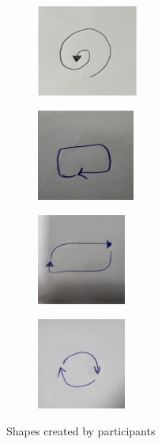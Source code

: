 \documentclass[oneside,%
                    author={Malak Hajji},
                    degree={BSc},
                    title={Designing An Accessible Ozobot Programming Platform for Students},
                  subtitle={With Mixed Visual Abilities}]{dissertation}
\begin{document}
\FloatBarrier
\begin{figure}[h]
\centering
\begin{subfigure}{.2\textwidth}
  \centering
  \includegraphics[width=\textwidth,height=3cm]{thesis/spiral.eps}
  \caption{}
  \label{fig:sub1}
\end{subfigure}%
\begin{subfigure}{.2\textwidth}
  \centering
  \includegraphics[width=\textwidth,height=3cm]{thesis/spotify.eps}
  \caption{} 
  \label{fig:sub2}
\end{subfigure}%
\begin{subfigure}{.2\textwidth}
  \centering
  \includegraphics[width=\textwidth,height=3cm]{thesis/repeat2.eps}
  \caption{}
  \label{fig:sub3}
\end{subfigure}%
\begin{subfigure}{.2\textwidth}
  \centering
  \includegraphics[width=\textwidth,height=3cm]{thesis/repeat.eps}
  \caption{}
  \label{fig:sub4}
\end{subfigure}
\caption{Shapes created by participants}
\label{fig:test}
\end{figure}
\FloatBarrier
\end{document}
